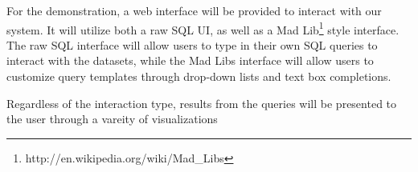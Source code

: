 For the demonstration, a web interface will be provided to interact with our
system. It will utilize both a raw SQL UI, as well as a Mad
Lib\footnote{http://en.wikipedia.org/wiki/Mad\_Libs} style interface. The raw
SQL interface will allow users to type in their own SQL queries to interact with
the datasets, while the Mad Libs interface will allow users to customize query
templates through drop-down lists and text box completions.

Regardless of the interaction type, results from the queries will be presented 
to the user through a vareity of visualizations

